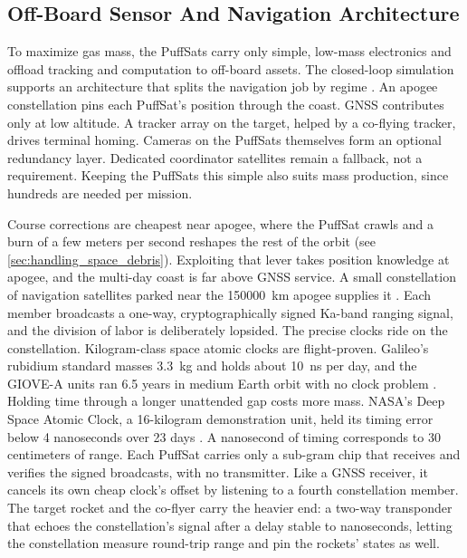 \documentclass{article}
\begin{document}
\subsection{Off-Board Sensor And Navigation Architecture}\label{sec:sensor_architecture}
To maximize gas mass, the PuffSats carry only simple, low-mass electronics and offload tracking and computation to off-board assets. The closed-loop simulation supports an architecture that splits the navigation job by regime \cite{Katz_puffsat_control_sim_2026}. An apogee constellation pins each PuffSat's position through the coast. GNSS contributes only at low altitude. A tracker array on the target, helped by a co-flying tracker, drives terminal homing. Cameras on the PuffSats themselves form an optional redundancy layer. Dedicated coordinator satellites remain a fallback, not a requirement. Keeping the PuffSats this simple also suits mass production, since hundreds are needed per mission.

Course corrections are cheapest near apogee, where the PuffSat crawls and a burn of a few meters per second reshapes the rest of the orbit (see \autoref{sec:handling_space_debris}). Exploiting that lever takes position knowledge at apogee, and the multi-day coast is far above GNSS service. A small constellation of navigation satellites parked near the \SI{150000}{\kilo\meter} apogee supplies it \cite{Katz_puffsat_control_sim_2026}. Each member broadcasts a one-way, cryptographically signed Ka-band ranging signal, and the division of labor is deliberately lopsided. The precise clocks ride on the constellation. Kilogram-class space atomic clocks are flight-proven. Galileo's rubidium standard masses \SI{3.3}{\kilo\gram} and holds about \SI{10}{\nano\second} per day, and the GIOVE-A units ran 6.5 years in medium Earth orbit with no clock problem \cite{rochat2005galileo_clocks,esa_giove_a}. Holding time through a longer unattended gap costs more mass. NASA's Deep Space Atomic Clock, a 16-kilogram demonstration unit, held its timing error below 4 nanoseconds over 23 days \cite{burt2021dsac}. A nanosecond of timing corresponds to 30 centimeters of range. Each PuffSat carries only a sub-gram chip that receives and verifies the signed broadcasts, with no transmitter. Like a GNSS receiver, it cancels its own cheap clock's offset by listening to a fourth constellation member. The target rocket and the co-flyer carry the heavier end: a two-way transponder that echoes the constellation's signal after a delay stable to nanoseconds, letting the constellation measure round-trip range and pin the rockets' states as well.
\end{document}
